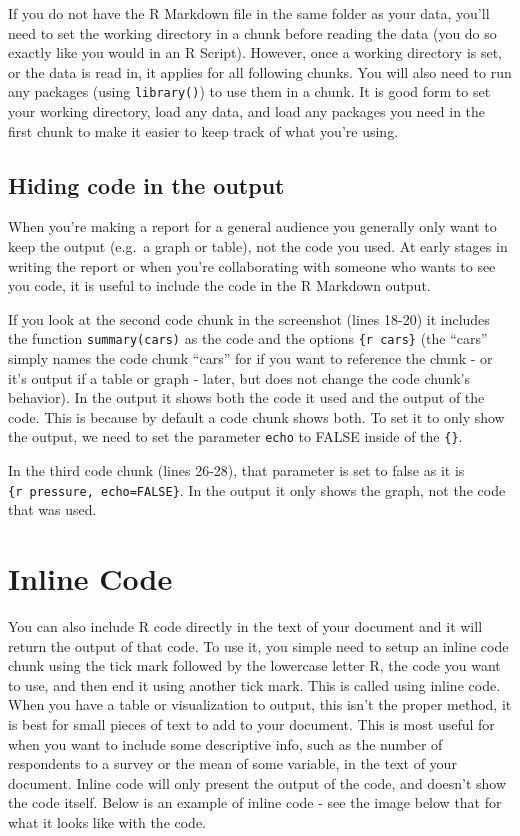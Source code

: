\documentclass[
  12pt,
]{book}
\begin{document}
If you do not have the R Markdown file in the same folder as your data, you'll need to set the working directory in a chunk before reading the data (you do so exactly like you would in an R Script). However, once a working directory is set, or the data is read in, it applies for all following chunks. You will also need to run any packages (using \texttt{library()}) to use them in a chunk. It is good form to set your working directory, load any data, and load any packages you need in the first chunk to make it easier to keep track of what you're using.

\hypertarget{hiding-code-in-the-output}{%
\subsection{Hiding code in the output}\label{hiding-code-in-the-output}}

When you're making a report for a general audience you generally only want to keep the output (e.g.~a graph or table), not the code you used. At early stages in writing the report or when you're collaborating with someone who wants to see you code, it is useful to include the code in the R Markdown output.

If you look at the second code chunk in the screenshot (lines 18-20) it includes the function \texttt{summary(cars)} as the code and the options \texttt{\{r\ cars\}} (the ``cars'' simply names the code chunk ``cars'' for if you want to reference the chunk - or it's output if a table or graph - later, but does not change the code chunk's behavior). In the output it shows both the code it used and the output of the code. This is because by default a code chunk shows both. To set it to only show the output, we need to set the parameter \texttt{echo} to FALSE inside of the \texttt{\{\}}.

In the third code chunk (lines 26-28), that parameter is set to false as it is \texttt{\{r\ pressure,\ echo=FALSE\}}. In the output it only shows the graph, not the code that was used.

\hypertarget{inline-code}{%
\section{Inline Code}\label{inline-code}}

You can also include R code directly in the text of your document and it will return the output of that code. To use it, you simple need to setup an inline code chunk using the tick mark followed by the lowercase letter R, the code you want to use, and then end it using another tick mark. This is called using inline code. When you have a table or visualization to output, this isn't the proper method, it is best for small pieces of text to add to your document. This is most useful for when you want to include some descriptive info, such as the number of respondents to a survey or the mean of some variable, in the text of your document. Inline code will only present the output of the code, and doesn't show the code itself. Below is an example of inline code - see the image below that for what it looks like with the code.
\end{document}
